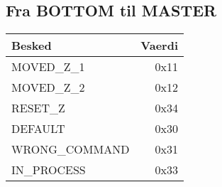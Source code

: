 \subsection{Fra BOTTOM til MASTER}

\begin{table}[H]
\begin{tabular}{| l | r |}
\hline
Besked & Vaerdi\\\hline
MOVED\_Z\_1 & 0x11\\\hline
MOVED\_Z\_2 & 0x12\\\hline
RESET\_Z & 0x34\\\hline
DEFAULT & 0x30\\\hline
WRONG\_COMMAND & 0x31\\\hline
IN\_PROCESS & 0x33\\\hline
\end{tabular}
\end{table}